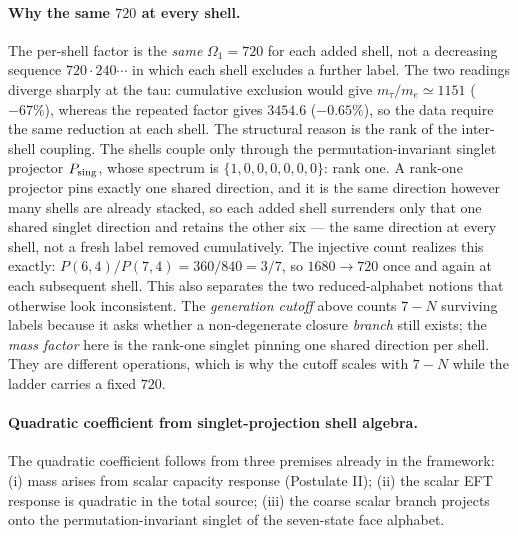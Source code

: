 \documentclass[11pt]{article}
\begin{document}
\paragraph{Why the same $720$ at every shell.}
The per-shell factor is the \emph{same} $\Omega_1=720$ for each added shell, not a decreasing sequence $720\cdot240\cdots$ in which each shell excludes a further label. The two readings diverge sharply at the tau: cumulative exclusion would give $m_\tau/m_e\simeq1151$ ($-67\%$), whereas the repeated factor gives $3454.6$ ($-0.65\%$), so the data require the same reduction at each shell. The structural reason is the rank of the inter-shell coupling. The shells couple only through the permutation-invariant singlet projector $P_{\rm sing}$, whose spectrum is $\{1,0,0,0,0,0,0\}$: rank one. A rank-one projector pins exactly one shared direction, and it is the same direction however many shells are already stacked, so each added shell surrenders only that one shared singlet direction and retains the other six --- the same direction at every shell, not a fresh label removed cumulatively. The injective count realizes this exactly: $P(6,4)/P(7,4)=360/840=3/7$, so $1680\to720$ once and again at each subsequent shell. This also separates the two reduced-alphabet notions that otherwise look inconsistent. The \emph{generation cutoff} above counts $7-N$ surviving labels because it asks whether a non-degenerate closure \emph{branch} still exists; the \emph{mass factor} here is the rank-one singlet pinning one shared direction per shell. They are different operations, which is why the cutoff scales with $7-N$ while the ladder carries a fixed $720$.

\paragraph{Quadratic coefficient from singlet-projection shell algebra.}
The quadratic coefficient follows from three premises already in the framework: (i) mass arises from scalar capacity response (Postulate II); (ii) the scalar EFT response is quadratic in the total source; (iii) the coarse scalar branch projects onto the permutation-invariant singlet of the seven-state face alphabet.
\end{document}
